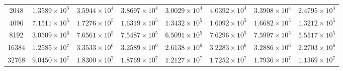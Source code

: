 \begin{appendices}
\begin{table}[ht]
{\begin{tabular}{@{}crrrrrrr@{}}
    2048 & $1.3589\times 10^5$ & $3.5944\times 10^4$ & $3.8697\times 10^4$ & $3.0029\times 10^4$ & $4.0392\times 10^4$ & $3.3908\times 10^4$ & $2.4795\times 10^4$ \\
    4096 & $7.1511\times 10^5$ & $1.7276\times 10^5$ & $1.6319\times 10^5$ & $1.3432\times 10^5$ & $1.6092\times 10^5$ & $1.6682\times 10^5$ & $1.3212\times 10^5$ \\
    8192 & $3.0509\times 10^6$ & $7.6561\times 10^5$ & $7.5487\times 10^5$ & $6.5091\times 10^5$ & $7.6296\times 10^5$ & $7.5997\times 10^5$ & $5.5517\times 10^5$ \\
    16384 & $1.2585\times 10^7$ & $3.3533\times 10^6$ & $3.2589\times 10^6$ & $2.6138\times 10^6$ & $3.2283\times 10^6$ & $3.2886\times 10^6$ & $2.2703\times 10^6$ \\
    32768 & $9.0450\times 10^7$ & $1.8300\times 10^7$ & $1.8769\times 10^7$ & $1.2127\times 10^7$ & $1.7252\times 10^7$ & $1.7936\times 10^7$ & $1.1369\times 10^7$ \\ \bottomrule

\end{tabular}}
\end{table}
\end{appendices}
